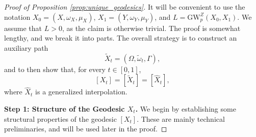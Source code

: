 \documentclass{article}
\theoremstyle{definition}
\newcommand{\dgwz}{\mathrm{GW}_p^Z}
\begin{document}
\begin{proof}[Proof of Proposition \ref{prop:unique_geodesics}]
    It will be convenient to use the notation $X_0 = (X, \omega_X, \mu_X)$, $X_1 = (Y, \omega_Y, \mu_Y)$, and $L = \dgwz(X_0, X_1)$. We assume that $L > 0$, as the claim is otherwise trivial. The proof is somewhat lengthy, and we break it into parts. The overall strategy is to construct an auxiliary path
    \[
    \widetilde{X}_t = (\Omega, \tilde{\omega}_t, \Gamma),
    \]
    and to then show that, for every $t \in [0,1]$, 
    \[
    [X_t] = \left[\widetilde{X}_t\right] = \left[\widehat{X}_t\right],
    \]
    where $\widehat{X}_t$ is a generalized interpolation.

\smallskip
    \noindent \textbf{Step 1: Structure of the Geodesic $X_t$.} We begin by establishing some structural properties of the geodesic $[X_t]$. These are mainly technical preliminaries, and will be used later in the proof.


\end{proof}
\end{document}
